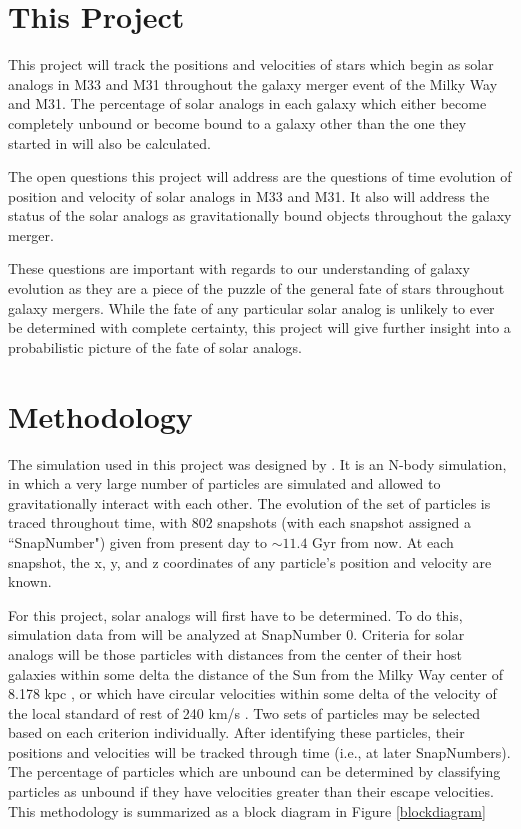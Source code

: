 \documentclass{aastex63}
\begin{document}
\section{This Project} \label{sec:proposal}

This project will track the positions and velocities of stars which begin as solar analogs in M33 and M31 throughout the galaxy merger event of the Milky Way and M31. The percentage of solar analogs in each galaxy which either become completely unbound or become bound to a galaxy other than the one they started in will also be calculated. 

The open questions this project will address are the questions of time evolution of position and velocity of solar analogs in M33 and M31. It also will address the status of the solar analogs as gravitationally bound objects throughout the galaxy merger. 

These questions are important with regards to our understanding of galaxy evolution as they are a piece of the puzzle of the general fate of stars throughout galaxy mergers. While the fate of any particular solar analog is unlikely to ever be determined with complete certainty, this project will give further insight into a probabilistic picture of the fate of solar analogs.   

\section{Methodology}

The simulation used in this project was designed by \cite{van12}. It is an N-body simulation, in which a very large number of particles are simulated and allowed to gravitationally interact with each other. The evolution of the set of particles is traced throughout time, with 802 snapshots (with each snapshot assigned a ``SnapNumber") given from present day to $\sim 11.4$ Gyr from now. At each snapshot, the x, y, and z coordinates of any particle's position and velocity are known.

For this project, solar analogs will first have to be determined. To do this, simulation data from \cite{van12} will be analyzed at SnapNumber 0. Criteria for solar analogs will be those particles with distances from the center of their host galaxies within some delta the distance of the Sun from the Milky Way center of 8.178 kpc \citep{abuter19}, or which have circular velocities within some delta of the velocity of the local standard of rest of 240 km/s \citep{reid14}. Two sets of particles may be selected based on each criterion individually. After identifying these particles, their positions and velocities will be tracked through time (i.e., at later SnapNumbers). The percentage of particles which are unbound can be determined by classifying particles as unbound if they have velocities greater than their escape velocities. This methodology is summarized as a block diagram in Figure \ref{blockdiagram}
\end{document}
